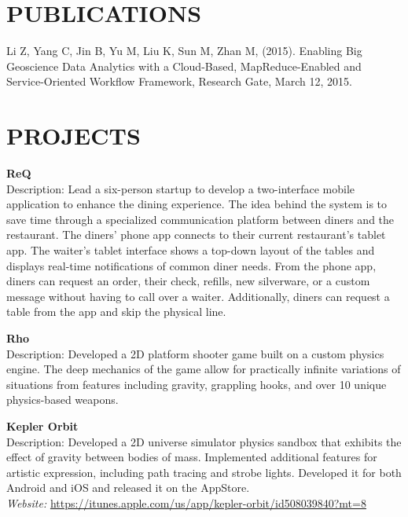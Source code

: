 \documentclass[line,margin]{res}
\begin{document}
\begin{resume}
                 \section{PUBLICATIONS}
                 Li Z, Yang C, Jin B, Yu M, Liu K, Sun M, Zhan M, (2015). Enabling Big Geoscience Data Analytics with a Cloud-Based, MapReduce-Enabled and Service-Oriented Workflow Framework, Research Gate, March 12, 2015.

                 \section{PROJECTS}
                         \textbf {ReQ} \\                 
                         Description: Lead a six-person startup to develop a two-interface mobile application to enhance the dining experience. The idea behind the system is to save time through a specialized communication platform between diners and the restaurant. The diners' phone app connects to their current restaurant's tablet app. The waiter's tablet interface shows a top-down layout of the tables and displays real-time notifications of common diner needs. From the phone app, diners can request an order, their check, refills, new silverware, or a custom message without having to call over a waiter. Additionally, diners can request a table from the app and skip the physical line.

                         \textbf{Rho} \\
                         Description: Developed a 2D platform shooter game built on a custom physics engine. The deep mechanics of the game allow for practically infinite variations of situations from features including gravity, grappling hooks, and over 10 unique physics-based weapons.

                         \textbf{Kepler Orbit} \\
                         Description: Developed a 2D universe simulator physics sandbox that exhibits the effect of gravity between bodies of mass. Implemented additional features for artistic expression, including path tracing and strobe lights. Developed it for both Android and iOS and released it on the AppStore. \\
                         \textit{Website: } \url{https://itunes.apple.com/us/app/kepler-orbit/id508039840?mt=8}
                         

\end{resume}
\end{document}

